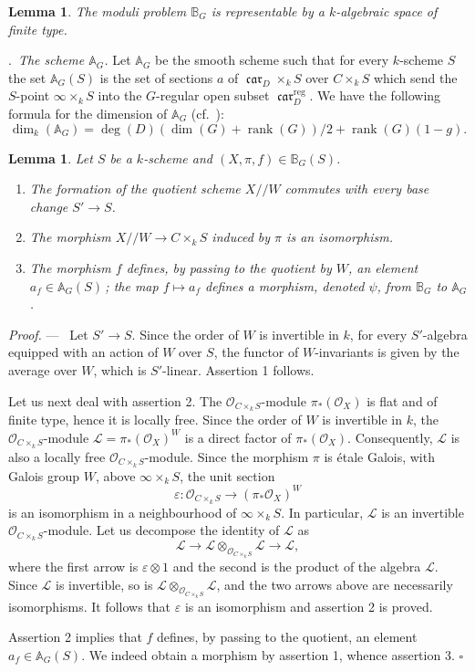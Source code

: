 \documentclass[12pt,a4paper,oneside,english,leqno]{smfart}
\makeatletter
\numberwithin{equation}{subsection}
\newcounter{theo}
\numberwithin{theo}{subsection}
\newenvironment{paragr}[1][]{\medskip\refstepcounter{subsection}%
  \par\noindent\hspace*{\parindent}\thesubsection.\ \emph{#1}%
  \@ifundefined{@empty}{}{}\ignorespaces}{\medskip}
\theoremstyle{plain}
\newtheorem{lemma}[theo]{Lemma}
\theoremstyle{definition}
\theoremstyle{remark}
\newenvironment{preuve}[1][]{\medskip\noindent\textit{Proof.} #1 ---\ }%
  {\hfill\ensuremath{\square}\medskip}
\DeclareMathOperator{\reg}{reg}
\DeclareMathOperator{\rang}{rank}
\DeclareMathOperator{\car}{\mathfrak{car}}
\newcommand{\AAA}{\mathbb{A}}
\newcommand{\BBB}{\mathbb{B}}
\newcommand{\oc}{\mathcal{O}}
\newcommand{\lc}{\mathcal{L}}
\newcommand{\eps}{\varepsilon}
\makeatother
\begin{document}
\begin{lemma}\label{thm:9.2.1}
The moduli problem $\BBB_G$ is representable by a $k$-algebraic space of finite type.
\end{lemma}

\begin{paragr}[The scheme $\AAA_G$.]\label{S:9.3}
Let $\AAA_G$ be the smooth scheme such that for every $k$-scheme $S$ the set $\AAA_G(S)$ is the set of sections $a$ of $\car_D\times_k S$ over $C\times_k S$ which send the $S$-point $\infty\times_k S$ into the $G$-regular open subset $\car_D^{\reg}$. We have the following formula for the dimension of $\AAA_G$ (cf.\ \cite[Lemma 4.13.1]{Ngo-lemme}):
\begin{equation}\label{eq:9.3.1}
\dim_k(\AAA_G)=\deg(D)(\dim(G)+\rang(G))/2+\rang(G)(1-g).
\end{equation}
\end{paragr}

\begin{lemma}\label{thm:9.3.1}
Let $S$ be a $k$-scheme and $(X,\pi,f)\in\BBB_G(S)$.
\begin{enumerate}
\item The formation of the quotient scheme $X//W$ commutes with every base change $S'\to S$. \item The morphism $X//W\to C\times_k S$ induced by $\pi$ is an isomorphism. \item The morphism $f$ defines, by passing to the quotient by $W$, an element $a_f\in\AAA_G(S)$\,; the map $f\mapsto a_f$ defines a morphism, denoted $\psi$, from $\BBB_G$ to $\AAA_G$.
\end{enumerate}
\end{lemma}

\begin{preuve}
Let $S'\to S$. Since the order of $W$ is invertible in $k$, for every $S'$-algebra equipped with an action of $W$ over $S$, the functor of $W$-invariants is given by the average over $W$, which is $S'$-linear. Assertion 1 follows.

Let us next deal with assertion 2. The $\oc_{C\times_k S}$-module $\pi_*(\oc_X)$ is flat and of finite type, hence it is locally free. Since the order of $W$ is invertible in $k$, the $\oc_{C\times_k S}$-module $\lc=\pi_*(\oc_X)^W$ is a direct factor of $\pi_*(\oc_X)$. Consequently, $\lc$ is also a locally free $\oc_{C\times_k S}$-module. Since the morphism $\pi$ is étale Galois, with Galois group $W$, above $\infty\times_k S$, the unit section
\[
\eps:\oc_{C\times_k S}\to(\pi_*\oc_X)^W
\]
is an isomorphism in a neighbourhood of $\infty\times_k S$. In particular, $\lc$ is an invertible $\oc_{C\times_k S}$-module. Let us decompose the identity of $\lc$ as
\[
\lc\to\lc\otimes_{\oc_{C\times_k S}}\lc\to\lc,
\]
where the first arrow is $\eps\otimes 1$ and the second is the product of the algebra $\lc$. Since $\lc$ is invertible, so is $\lc\otimes_{\oc_{C\times_k S}}\lc$, and the two arrows above are necessarily isomorphisms. It follows that $\eps$ is an isomorphism and assertion 2 is proved.

Assertion 2 implies that $f$ defines, by passing to the quotient, an element $a_f\in\AAA_G(S)$. We indeed obtain a morphism by assertion 1, whence assertion 3.
\end{preuve}
\end{document}
